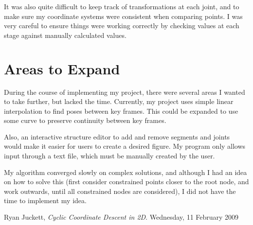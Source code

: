 \documentclass{article}
\begin{document}
    It was also quite difficult to keep track of transformations at each joint,
    and to make sure my coordinate systems were consistent when comparing
    points. I was very careful to ensure things were working correctly by
    checking values at each stage against manually calculated values.

    \section{Areas to Expand}
    During the course of implementing my project, there were several areas I
    wanted to take further, but lacked the time. Currently, my project uses
    simple linear interpolation to find poses between key frames. This could be
    expanded to use some curve to preserve continuity between key frames.

    Also, an interactive structure editor to add and remove segments and joints
    would make it easier for users to create a desired figure. My program only
    allows input through a text file, which must be manually created by the
    user.

    My algorithm converged slowly on complex solutions, and although I had an
    idea on how to solve this (first consider constrained points closer to the
    root node, and work outwards, until all constrained nodes are considered), I
    did not have the time to implement my idea.

    \begin{thebibliography}{9}
        Ryan Juckett,
        \emph{Cyclic Coordinate Descent in 2D}.
        Wednesday, 11 February 2009
    \end{thebibliography}
\end{document}
